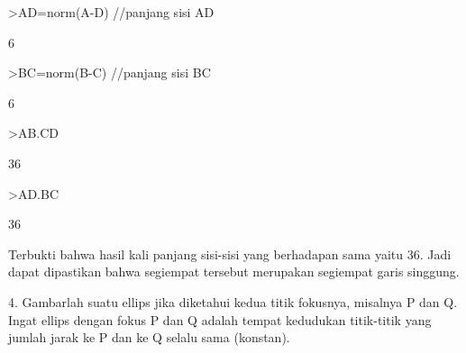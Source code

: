 \documentclass[a4paper,10pt]{article}
\begin{document}
\begin{eulernotebook}
\begin{eulercomment}
\begin{eulercomment}
\begin{eulercomment}
\begin{eulercomment}
\begin{eulercomment}
\begin{eulercomment}
\begin{eulercomment}
\begin{eulercomment}
\begin{eulercomment}
\begin{eulercomment}
\begin{eulercomment}
\begin{eulercomment}
\begin{eulercomment}
\begin{eulercomment}
\begin{eulercomment}
\begin{eulercomment}
\begin{eulercomment}
\begin{eulercomment}
\begin{eulercomment}
\begin{eulercomment}
\begin{eulercomment}
\begin{eulercomment}
\begin{eulercomment}
\begin{eulercomment}
\begin{eulercomment}
\begin{eulercomment}
\begin{eulercomment}
\begin{eulercomment}
\begin{eulercomment}
\begin{eulercomment}
\begin{eulerprompt}
>AD=norm(A-D) //panjang sisi AD
\end{eulerprompt}
\begin{euleroutput}
  6
\end{euleroutput}
\begin{eulerprompt}
>BC=norm(B-C) //panjang sisi BC
\end{eulerprompt}
\begin{euleroutput}
  6
\end{euleroutput}
\begin{eulerprompt}
>AB.CD
\end{eulerprompt}
\begin{euleroutput}
  36
\end{euleroutput}
\begin{eulerprompt}
>AD.BC
\end{eulerprompt}
\begin{euleroutput}
  36
\end{euleroutput}
\begin{eulercomment}
Terbukti bahwa hasil kali panjang sisi-sisi yang berhadapan sama yaitu
36. Jadi dapat dipastikan bahwa segiempat tersebut merupakan segiempat
garis singgung.


4. Gambarlah suatu ellips jika diketahui kedua titik fokusnya,
misalnya P dan Q. Ingat ellips dengan fokus P dan Q adalah tempat
kedudukan titik-titik yang jumlah jarak ke P dan ke Q selalu sama
(konstan).


\end{eulercomment}
\end{eulercomment}
\end{eulercomment}
\end{eulercomment}
\end{eulercomment}
\end{eulercomment}
\end{eulercomment}
\end{eulercomment}
\end{eulercomment}
\end{eulercomment}
\end{eulercomment}
\end{eulercomment}
\end{eulercomment}
\end{eulercomment}
\end{eulercomment}
\end{eulercomment}
\end{eulercomment}
\end{eulercomment}
\end{eulercomment}
\end{eulercomment}
\end{eulercomment}
\end{eulercomment}
\end{eulercomment}
\end{eulercomment}
\end{eulercomment}
\end{eulercomment}
\end{eulercomment}
\end{eulercomment}
\end{eulercomment}
\end{eulercomment}
\end{eulercomment}
\end{eulernotebook}
\end{document}
